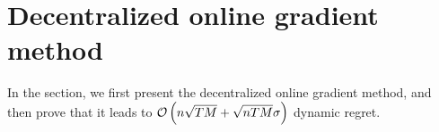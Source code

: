 \documentclass{article}
\begin{document}
%
%
%
%




\section{Decentralized online gradient method}
In the section, we first present the decentralized online gradient method, and then prove that it leads to ${\mathcal{O}\left( n\sqrt{TM} + \sqrt{nTM}\sigma \right)}$ dynamic regret. 
\end{document}
